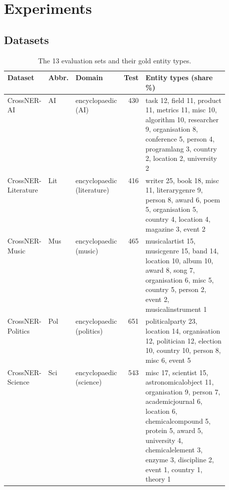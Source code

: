 \section{Experiments}
\label{sec:experiments}


\subsection{Datasets}
\label{sec:exp:datasets}

\begin{table}[tp]
\centering
\caption{The 13 evaluation sets and their gold entity types.}
\label{tab:datasets}
\scriptsize
\setlength{\tabcolsep}{4pt}
\begin{adjustbox}{max width=\textwidth}
\begin{threeparttable}
\begin{tabular}{@{}lllr>{\raggedright\arraybackslash}p{0.52\linewidth}@{}}
\toprule
Dataset & Abbr. & Domain & Test & Entity types (share \%) \\
\midrule
CrossNER-AI & AI & encyclopaedic (AI) & 430 & task 12, field 11, product 11, metrics 11, misc 10, algorithm 10, researcher 9, organisation 8, conference 5, person 4, programlang 3, country 2, location 2, university 2 \\
\addlinespace
CrossNER-Literature & Lit & encyclopaedic (literature) & 416 & writer 25, book 18, misc 11, literarygenre 9, person 8, award 6, poem 5, organisation 5, country 4, location 4, magazine 3, event 2 \\
\addlinespace
CrossNER-Music & Mus & encyclopaedic (music) & 465 & musicalartist 15, musicgenre 15, band 14, location 10, album 10, award 8, song 7, organisation 6, misc 5, country 5, person 2, event 2, musicalinstrument 1 \\
\addlinespace
CrossNER-Politics & Pol & encyclopaedic (politics) & 651 & politicalparty 23, location 14, organisation 12, politician 12, election 10, country 10, person 8, misc 6, event 5 \\
\addlinespace
CrossNER-Science & Sci & encyclopaedic (science) & 543 & misc 17, scientist 15, astronomicalobject 11, organisation 9, person 7, academicjournal 6, location 6, chemicalcompound 5, protein 5, award 5, university 4, chemicalelement 3, enzyme 3, discipline 2, event 1, country 1, theory 1 \\

\end{tabular}
\end{threeparttable}
\end{adjustbox}
\end{table}
